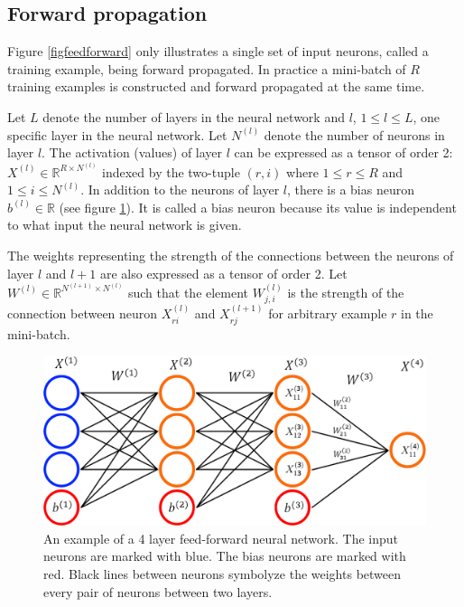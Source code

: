 \documentclass[a4paper, twoside]{article}
\begin{document}
\subsection{Forward propagation}
Figure \ref{figfeedforward} only illustrates a single set of input neurons, called a training example, being forward propagated. In practice a mini-batch of $R$ training examples is constructed and forward propagated at the same time. \cite{cs231n} \cite{wikiStanford}

Let $L$ denote the number of layers in the neural network and $l$, $1 \leq l \leq L$, one specific layer in the neural network. Let $N^{(l)}$ denote the number of neurons in layer $l$. The activation (values) of layer $l$ can be expressed as a tensor of order 2: $X^{(l)} \in \mathbb{R}^{R \times N^{(l)}}$ indexed by the two-tuple $(r,i)$ where $1 \leq r \leq R$ and $1 \leq i \leq N^{(l)}$. In addition to the neurons of layer $l$, there is a bias neuron $b^{(l)} \in \mathbb{R}$ (see figure \ref{figFCCmath}). It is called a bias neuron because its value is independent to what input the neural network is given. \cite{cs231n} \cite{wikiStanford}

The weights representing the strength of the connections between the neurons of layer $l$ and $l+1$ are also expressed as a tensor of order 2. Let $W^{(l)} \in \mathbb{R}^{N^{(l+1)}  \times N^{(l)}}$ such that the element $W_{j, i}^{(l)}$ is the strength of the connection between neuron $X_{ri}^{(l)}$ and $X_{rj}^{(l+1)}$ for arbitrary example $r$ in the mini-batch. \cite{cs231n} \cite{wikiStanford}

\begin{figure}[h]
	\centering
  		\includegraphics[scale=0.4]{FCC.png}
  	\caption{An example of a 4 layer feed-forward neural network. The input neurons are marked with blue. The bias neurons are marked with red. Black lines between neurons symbolyze the weights between every pair of neurons between two layers.} \label{figFCCmath}
\end{figure}
\end{document}
